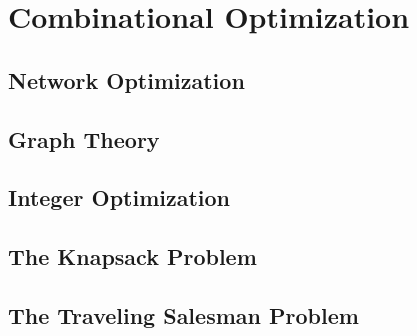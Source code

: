 \chapter{Combinational Optimization}
\section{Network Optimization}
\section{Graph Theory}
\section{Integer Optimization}
\section{The Knapsack Problem}
\section{The Traveling Salesman Problem}